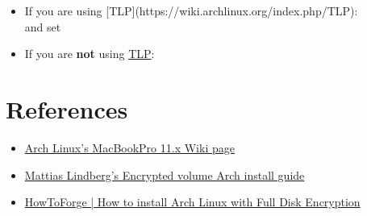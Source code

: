 \begin{itemize}[noitemsep,topsep=0pt,leftmargin=*]
    \item If you are using [TLP](https://wiki.archlinux.org/index.php/TLP):\\
         and set 
    \item If you are \textbf{not} using \href{https://wiki.archlinux.org/index.php/TLP}{TLP}:\\
\end{itemize}



\clearpage
\section{References}

\begin{itemize}
	\item \href{https://wiki.archlinux.org/index.php/MacBookPro11,x#Using_the_MacBook.27s_native_EFI_bootloader_.28recommended.29}{Arch Linux's MacBookPro 11.x Wiki page}
	\item \href{https://gist.github.com/mattiaslundberg/8620837}{Mattias Lindberg's Encrypted volume Arch install guide}
	\item \href{https://www.howtoforge.com/tutorial/how-to-install-arch-linux-with-full-disk-encryption/}{HowToForge | How to install Arch Linux with Full Disk Encryption}
\end{itemize}


